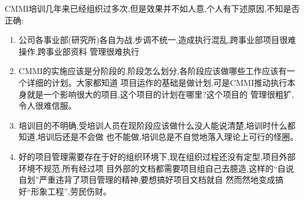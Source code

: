 \documentclass[11pt]{article}
\begin{document}
\begin{staff}

\slogo CMMI培训几年来已经组织过多次,但是效果并不如人意,个人有下述原因,不知是否正确:
\begin{enumerate}
  \item 公司各事业部(研究所)各自为战,步调不统一,造成执行混乱,跨事业部项目很难操作,跨事业部资料
管理很难执行

  \item CMMI的实施应该是分阶段的,阶段怎么划分,各阶段应该做哪些工作应该有一个详细的计划。大家都知道
项目运作的基础是做计划,可是CMMI推动执行本身就是一个影响很大的项目,这个项目的计划在哪里?这个项目的
管理很粗犷,令人很难信服。

  \item 培训目的不明确,受培训人员在现阶段应该做什么没人能说清楚,培训时什么都知道,培训后还是不会做
也不能做,培训总是不自觉地落入理论上可行的怪圈。

  \item 好的项目管理需要存在于好的组织环境下,现在组织过程还没有定型,项目外部环境不规范,所有经过项
目外部的文档都需要项目组自己去臆造,这样的``自说自划''严重违背了项目管理的精神,要想搞好项目文档就自
然而然地变成搞好``形象工程'',劳民伤财。
\end{enumerate}

\end{staff}
\end{document}
